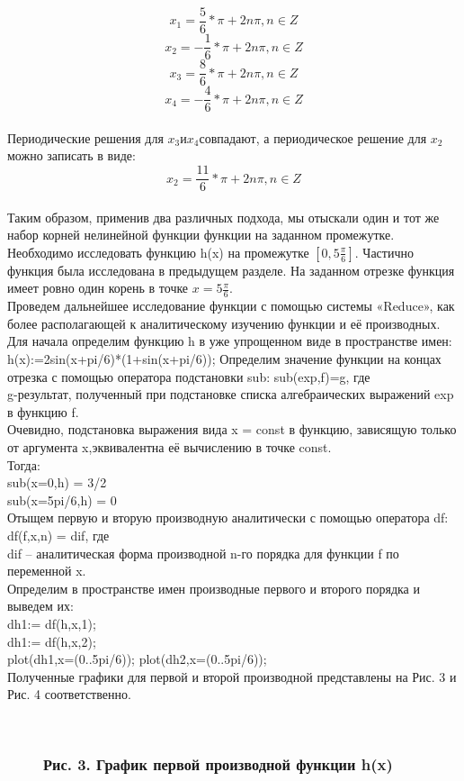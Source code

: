 ﻿ \documentclass[russian,utf8,nocolumnxxxi,nocolumnxxxii]{eskdtext}
\begin{document}
$$x_1=\frac{5}{6}*\pi+2n\pi,n\in Z$$
$$x_2=-\frac{1}{6}*\pi+2n\pi,n\in Z$$
$$x_3=\frac{8}{6}*\pi+2n\pi,n\in Z$$
$$x_4=-\frac{4}{6}*\pi+2n\pi,n\in Z$$\\
Периодические решения для $x_3$и$x_4$совпадают, а периодическое решение для $x_2$ можно записать в виде:
$$x_2=\frac{11}{6}*\pi+2n\pi,n\in Z$$\\
Таким образом, применив два различных подхода, мы отыскали один и тот же набор корней нелинейной функции
\newpage
{ функции на заданном промежутке.}\\
Необходимо исследовать функцию h(x)  на промежутке $[0,5\frac{\pi}{6}]$.
Частично функция была исследована в предыдущем разделе. На заданном отрезке функция имеет ровно один корень в точке $x=5\frac{\pi}{6}$.\\
Проведем дальнейшее исследование функции с помощью системы «Reduce», как более располагающей к аналитическому изучению функции и её производных. Для начала определим функцию h в уже упрощенном виде в пространстве имен:\\
h(x):=2sin(x+pi/6)*(1+sin(x+pi/6));
Определим значение функции на концах отрезка с помощью оператора подстановки sub:
sub(exp,f)=g, где\\
g-результат, полученный при подстановке списка алгебраических выражений exp в функцию f.\\
Очевидно, подстановка выражения вида x = const в функцию, зависящую только от аргумента x,эквивалентна её вычислению в точке const.\\
Тогда:\\
sub(x=0,h) = 3/2\\
sub(x=5pi/6,h) = 0\\
Отыщем первую и вторую производную аналитически с помощью оператора df:\\
df(f,x,n) = dif, где\\
dif – аналитическая форма производной n-го порядка для функции f по переменной x.\\
Определим в пространстве имен производные первого и второго порядка и выведем их:\\
dh1:= df(h,x,1);\\
dh1:= df(h,x,2);\\
plot(dh1,x=(0..5pi/6));
\newpage
plot(dh2,x=(0..5pi/6));\\
Полученные графики для первой и второй производной представлены на Рис. 3 и Рис. 4 соответственно.
\begin{figure}[H]
\begin{center}
\begin{minipage}[h]{0.70\linewidth}
  \\
\frametitle{Рис. 3. График первой производной функции h(x)}
\frametitle{}
\end{minipage}
\end{center}
\end{figure}
\end{document}
